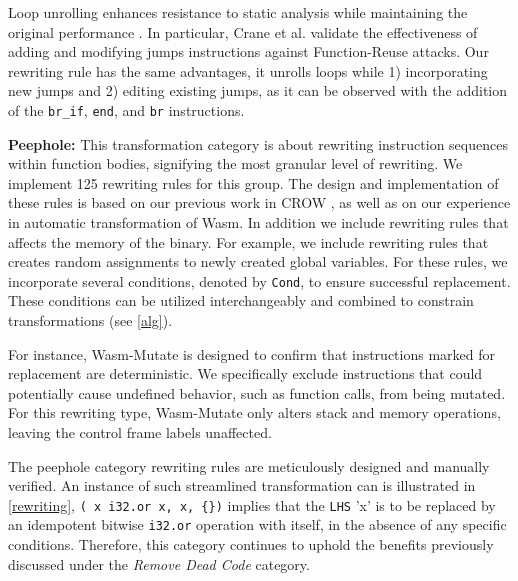 \documentclass[sigplan,screen]{acmart}
\newcommand*\badge[1]{ \colorbox{red}{\color{white}#1}}
\newcommand{\tool}{{\sc Wasm-Mutate}\xspace}
\newcommand{\wasm}{Wasm\xspace}
\newcommand{\todo}[1]{%
\refstepcounter{todo}
\noindent\textbf{\badge{TODO}} {\color{red}#1}
\addcontentsline{td}{todo}
{\color{red}\thesection.\thetodo\xspace #1}}
\begin{document}
Loop unrolling enhances resistance to static analysis while maintaining the original performance \cite{10.1145/3453483.3454035}. 
In particular, Crane et al. \cite{10.1145/2810103.2813682} validate the effectiveness of adding and modifying jumps instructions against Function-Reuse attacks.
Our rewriting rule has the same advantages, it unrolls loops while 1) incorporating new jumps and 2) editing existing jumps, as it can be observed with the addition of the \texttt{br_if}, \texttt{end}, and \texttt{br} instructions. 



\textbf{Peephole:} 
This transformation category is about rewriting instruction sequences within function bodies, signifying the most granular level of rewriting. 
We implement 125 rewriting rules for this group. 
The design and implementation of these rules is based on our previous work in CROW \cite{arteaga2020crow}, as well as on our experience in automatic transformation of \wasm.
In addition we include rewriting rules that affects the memory of the binary.
For example, we include rewriting rules that creates random assignments to newly created global variables.
For these rules, we incorporate several conditions, denoted by \texttt{Cond}, to ensure successful replacement. 
These conditions can be utilized interchangeably and combined to constrain transformations (see \autoref{alg}).

For instance, \tool is designed to confirm that instructions marked for replacement are deterministic. 
We specifically exclude instructions that could potentially cause undefined behavior, such as function calls, from being mutated. 
For this rewriting type, \tool only alters stack and memory operations, leaving the control frame labels unaffected.

The peephole category rewriting rules are meticulously designed and manually verified. 
An instance of such streamlined transformation can is illustrated in \autoref{rewriting}, \texttt{(\ x\ i32.or\ x, x, \{\})} implies that the \texttt{LHS} 'x' is to be replaced by an idempotent bitwise \texttt{i32.or} operation with itself, in the absence of any specific conditions.
Therefore, this category continues to uphold the benefits previously discussed under the \emph{Remove Dead Code} category.
\end{document}
